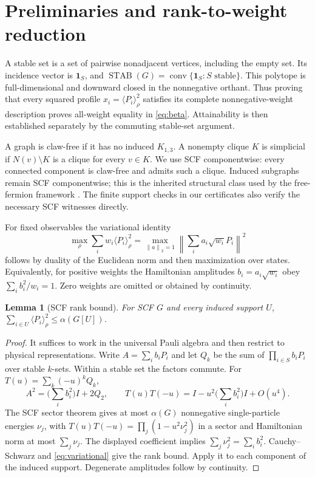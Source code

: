 \documentclass[11pt,a4paper]{article}
\newtheorem{lemma}[theorem]{Lemma}
\theoremstyle{remark}\newtheorem{remark}[theorem]{Remark}
\newcommand{\STAB}{\operatorname{STAB}}
\newcommand{\norm}[1]{\left\lVert#1\right\rVert}
\newcommand{\ev}[1]{\langle#1\rangle_\rho}
\begin{document}
\section{Preliminaries and rank-to-weight reduction}\label{sec:prelim}
A stable set is a set of pairwise nonadjacent vertices, including the
empty set. Its incidence vector is $\mathbf1_S$, and
$\STAB(G)=\operatorname{conv}\{\mathbf1_S:S\text{ stable}\}$.
This polytope is full-dimensional and downward closed in the nonnegative
orthant. Thus proving that every squared profile
$x_i=\ev{P_i}^2$ satisfies its complete nonnegative-weight description
proves all-weight equality in \eqref{eq:beta}. Attainability is then
established separately by the commuting stable-set argument.

A graph is claw-free if it has no induced $K_{1,3}$. A nonempty clique
$K$ is simplicial if $N(v)\setminus K$ is a clique for every $v\in K$.
We use SCF componentwise: every connected component is claw-free and
admits such a clique. Induced subgraphs remain SCF componentwise; this
is the inherited structural class used by the free-fermion framework
\cite{cem}. The finite support checks in our certificates also verify
the necessary SCF witnesses directly.

For fixed observables the variational identity
\begin{equation}\label{eq:variational}
 \max_\rho\sum_iw_i\ev{P_i}^2
 =\max_{\norm{a}_2=1}\norm{\sum_i a_i\sqrt{w_i}P_i}^2
\end{equation}
follows by duality of the Euclidean norm and then maximization over
states. Equivalently, for positive weights the Hamiltonian amplitudes
$b_i=a_i\sqrt{w_i}$ obey $\sum_i b_i^2/w_i=1$.
Zero weights are omitted or obtained by continuity.

\begin{lemma}[SCF rank bound]\label{lem:rank}
For SCF $G$ and every induced support $U$,
$\sum_{i\in U}\ev{P_i}^2\leq\alpha(G[U])$.
\end{lemma}
\begin{proof}
It suffices to work in the universal Pauli algebra and then restrict to
physical representations. Write $A=\sum_i b_iP_i$ and let $Q_k$ be the
sum of $\prod_{i\in S}b_iP_i$ over stable $k$-sets. Within a stable set
the factors commute. For $T(u)=\sum_k(-u)^kQ_k$,
\[
 A^2=\Big(\sum_i b_i^2\Big)I+2Q_2,
 \qquad T(u)T(-u)=I-u^2\Big(\sum_i b_i^2\Big)I+O(u^4).
\]
The SCF sector theorem \cite{cem} gives at most $\alpha(G)$
nonnegative single-particle energies $\nu_j$, with
$T(u)T(-u)=\prod_j(1-u^2\nu_j^2)$ in a sector and Hamiltonian norm at
most $\sum_j\nu_j$. The displayed coefficient implies
$\sum_j\nu_j^2=\sum_i b_i^2$. Cauchy--Schwarz and
\eqref{eq:variational} give the rank bound. Apply it to each component
of the induced support. Degenerate amplitudes follow by continuity.
\end{proof}
\end{document}
